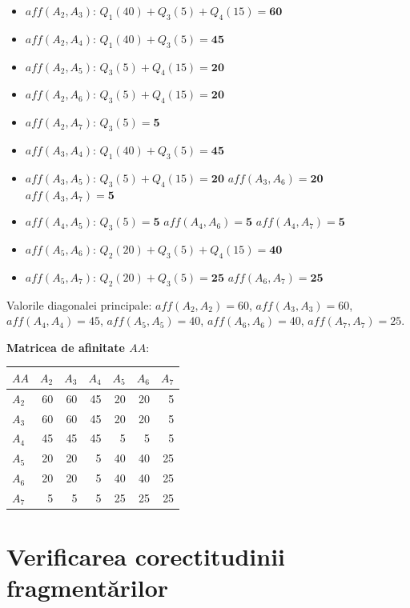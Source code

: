 \documentclass[12pt,a4paper]{article}
\begin{document}
\begin{itemize}
  \item $aff(A_2, A_3)$: $Q_1(40) + Q_3(5) + Q_4(15) = \mathbf{60}$
  \item $aff(A_2, A_4)$: $Q_1(40) + Q_3(5) = \mathbf{45}$
  \item $aff(A_2, A_5)$: $Q_3(5) + Q_4(15) = \mathbf{20}$
  \item $aff(A_2, A_6)$: $Q_3(5) + Q_4(15) = \mathbf{20}$
  \item $aff(A_2, A_7)$: $Q_3(5) = \mathbf{5}$
  \item $aff(A_3, A_4)$: $Q_1(40) + Q_3(5) = \mathbf{45}$
  \item $aff(A_3, A_5)$: $Q_3(5) + Q_4(15) = \mathbf{20}$ \quad $aff(A_3, A_6) = \mathbf{20}$ \quad $aff(A_3, A_7) = \mathbf{5}$
  \item $aff(A_4, A_5)$: $Q_3(5) = \mathbf{5}$ \quad $aff(A_4, A_6) = \mathbf{5}$ \quad $aff(A_4, A_7) = \mathbf{5}$
  \item $aff(A_5, A_6)$: $Q_2(20) + Q_3(5) + Q_4(15) = \mathbf{40}$
  \item $aff(A_5, A_7)$: $Q_2(20) + Q_3(5) = \mathbf{25}$ \quad $aff(A_6, A_7) = \mathbf{25}$
\end{itemize}

Valorile diagonalei principale: $aff(A_2,A_2)=60$, $aff(A_3,A_3)=60$, $aff(A_4,A_4)=45$,
$aff(A_5,A_5)=40$, $aff(A_6,A_6)=40$, $aff(A_7,A_7)=25$.

\textbf{Matricea de afinitate $AA$}:

\begin{center}
\begin{tabular}{l|rrrrrr}
\toprule
$AA$ & $A_2$ & $A_3$ & $A_4$ & $A_5$ & $A_6$ & $A_7$ \\
\midrule
$A_2$ & 60 & 60 & 45 & 20 & 20 &  5 \\
$A_3$ & 60 & 60 & 45 & 20 & 20 &  5 \\
$A_4$ & 45 & 45 & 45 &  5 &  5 &  5 \\
$A_5$ & 20 & 20 &  5 & 40 & 40 & 25 \\
$A_6$ & 20 & 20 &  5 & 40 & 40 & 25 \\
$A_7$ &  5 &  5 &  5 & 25 & 25 & 25 \\
\bottomrule
\end{tabular}
\end{center}

\section{Verificarea corectitudinii fragmentărilor}
\end{document}
